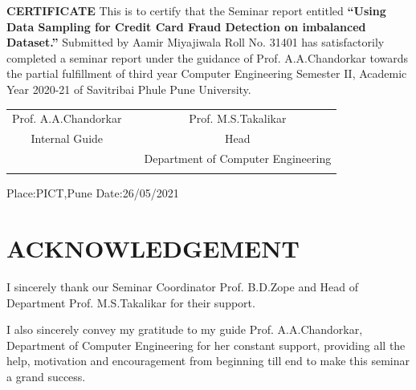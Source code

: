 \documentclass[a4paper, 12pt]{article}
\begin{document}
\begin{titlepage}
\begin{center}
	    \textbf{CERTIFICATE}
	    		\linebreak
	    \linebreak
		This is to certify that the Seminar report entitled
        \linebreak
		\linebreak
		\large
		\textbf{“Using Data Sampling for Credit Card Fraud Detection on imbalanced Dataset.”}
		\linebreak
		\linebreak
		Submitted by
		\linebreak
		Aamir Miyajiwala \hspace{10mm}   Roll No. 31401 \linebreak
		\linebreak
		has satisfactorily completed a seminar report under the guidance of Prof. A.A.Chandorkar  towards the partial fulfillment of third year Computer Engineering Semester II, Academic Year 2020-21 of Savitribai Phule Pune University. 
		\linebreak
		\linebreak
		\linebreak
		\linebreak
		\linebreak
		\begin{table}[h]
		\begin{tabular}{ccc}
		Prof. A.A.Chandorkar    &                        &  \hspace{52mm} Prof. M.S.Takalikar\\
		Internal Guide      &                     &    \hspace{52mm} Head \\
		          &                         &       \hspace{47mm} Department of Computer Engineering \\
                    &                       & \hspace{52mm} 
		\end{tabular}
		\end{table}
		\end{center}
Place:PICT,Pune
Date:26/05/2021

\end{titlepage} 

\section*{ACKNOWLEDGEMENT}

\hspace{0.5cm} I sincerely thank our Seminar Coordinator Prof. B.D.Zope and Head of Department Prof. M.S.Takalikar
for their support.
\vspace{0.25cm}
\par I also sincerely convey my gratitude to my guide Prof. A.A.Chandorkar, Department of Computer Engineering for her constant
support, providing all the help, motivation and encouragement from beginning till end to make this seminar a grand success.
\vspace{0.25cm}
\par 
\end{document}
